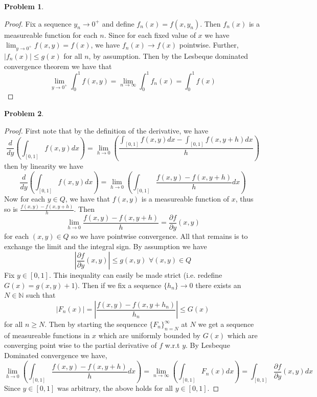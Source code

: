 \documentclass{article}
\newcommand{\N}{\mathbb{N}}
\newtheorem{prb}{Problem}
\begin{document}
\begin{prb}  \end{prb} 
\begin{proof} 
	Fix a sequence $y_n \to 0^+$ and define $f_n(x) = f(x, y_n)$. 
	Then $f_n(x)$ is a measureable function for each $n$. Since for each fixed value of $x$ we have 
	$\lim_{y \to 0^+} f(x, y)= f(x)$, we have $f_n(x) \to f(x)$ pointwise. 
	Further, $|f_n(x)| \leq g(x)$ for all $n$, by assumption. Then by the Lesbeque dominated convergence theorem we have that 
	\[ \lim_{y \to 0^+} \int_0^1 f(x, y)  = \lim_{n \to \infty} \int_0^1 f_n(x) =  \int_0^1 f(x) \] 
\end{proof} 

\begin{prb}  \end{prb} 
\begin{proof} 
 First note that by the definition of the derivative, we have 
\begin{equation}
	\frac{d}{dy} \left( \int_{[0, 1]} f(x,y) dx\right) = \lim_{h \to 0} \left( \frac{\int_{[0, 1]} f(x, y) dx - \int_{[0,1]} f(x, y + h)dx } { h} \right) 
\end{equation}
then by linearity we have 
\begin{equation}
	\frac{d}{dy} \left( \int_{[0, 1]} f(x,y) dx\right) = \lim_{h \to 0} \left( \int_{[0, 1]} \frac{f(x, y) - f(x, y + h) }{h} dx\right) 
\end{equation}
Now for each $y \in Q$, we have that $f(x, y)$ is a measureable function of $x$, thus so is $\frac{f(x, y) - f(x, y+ h)}{h}$. Then  
\[ \lim_{h \to 0 } \frac{f(x, y) - f(x, y + h)}{h} = \frac{\partial f} {\partial y}(x, y) \] 
for each $(x, y) \in Q$ so we have pointwise convergence. All that remains is to exchange the limit and the integral sign. 
By assumption we have 
\begin{equation}
	\left| \frac{\partial f} {\partial y} (x, y) \right| \leq g(x, y) \, \, \forall (x, y) \in Q
\end{equation}
Fix $y \in [0, 1]$. This inequality can easily be made strict (i.e. redefine $G(x) = g(x, y) + 1$). Then if we fix a sequence $\{h_n\} \to 0 $ there exists an $N \in \N$ such that 
\[|F_n(x) |= \left|\frac{f(x, y) - f(x, y + h_n)}{ h_n}\right| \leq G(x) \] 
for all $n \geq N$. Then by starting the sequencce $\{F_n\}_{n = N}^\infty$ at $N$ we get a sequence of measureable functions in $x$ which are uniformly bounded by $G(x)$ which are converging point wise
to the partial derivative of $f$ w.r.t $y$. By Lesbeque Dominated convergence we have,  
\begin{equation}	
	\lim_{h \to 0} \left( \int_{[0, 1]} \frac{f(x, y) - f(x, y + h) }{h} dx\right) = \lim_{n \to \infty} \left( \int_{[0, 1]} F_n(x) dx \right) = \int_{[0, 1]} \frac{\partial f}{\partial y} (x, y) dx 
\end{equation}
Since $y \in [0, 1]$ was arbitrary, the above holds for all $y \in [0, 1]$. 
\end{proof} 
\end{document}
